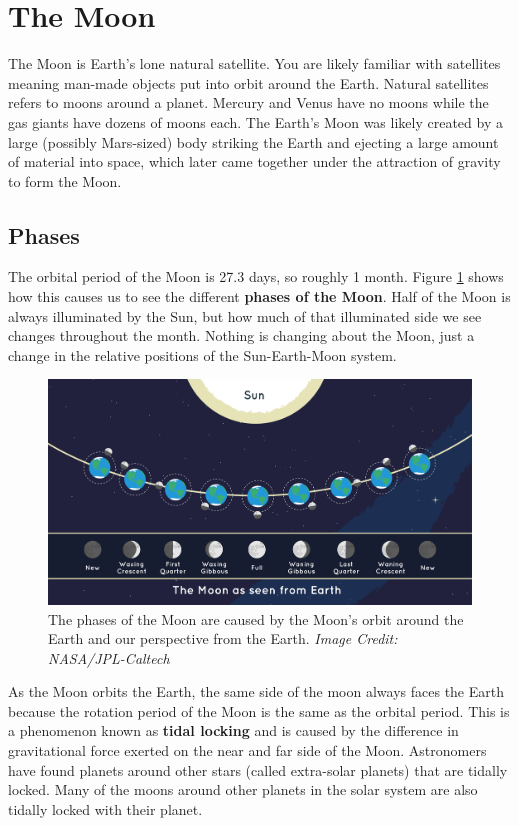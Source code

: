 \documentclass[12pt]{book}
\begin{document}
\section{The Moon}

The Moon is Earth's lone natural satellite. You are likely familiar with satellites meaning man-made objects put into orbit around the Earth. Natural satellites refers to moons around a planet. Mercury and Venus have no moons while the gas giants have dozens of moons each. The Earth's Moon was likely created by a large (possibly Mars-sized) body striking the Earth and ejecting a large amount of material into space, which later came together under the attraction of gravity to form the Moon.

\subsection{Phases} 

The orbital period of the Moon is 27.3 days, so roughly 1 month. Figure \ref{phases} shows how this causes us to see the different \textbf{phases of the Moon}. Half of the Moon is always illuminated by the Sun, but how much of that illuminated side we see changes throughout the month. Nothing is changing about the Moon, just a change in the relative positions of the Sun-Earth-Moon system.

\begin{figure}[H]
\centering
\includegraphics[scale=0.23]{359_moon-phases-jpl.png}
\caption{The phases of the Moon are caused by the Moon's orbit around the Earth and our perspective from the Earth. \textit{Image Credit: NASA/JPL-Caltech}}
\label{phases}
\end{figure}

As the Moon orbits the Earth, the same side of the moon always faces the Earth because the rotation period of the Moon is the same as the orbital period. This is a phenomenon known as \textbf{tidal locking} and is caused by the difference in gravitational force exerted on the near and far side of the Moon. Astronomers have found planets around other stars (called extra-solar planets) that are tidally locked. Many of the moons around other planets in the solar system are also tidally locked with their planet.
\end{document}
